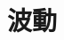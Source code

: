 \documentclass[../../all/physics-standard_answers_all.tex]{subfiles}
\begin{document}
\section{波動}
\end{document}
